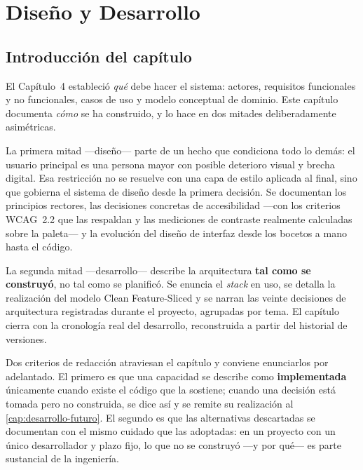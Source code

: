 \chapter{Diseño y Desarrollo}
\label{cap:diseno-desarrollo}

\newcommand{\partesep}[1]{%
  \bigskip
  \begin{center}\hrulefill\quad\textbf{\large #1}\quad\hrulefill\end{center}
  \addcontentsline{toc}{section}{#1}%
  \nopagebreak\medskip}

\section{Introducción del capítulo}

El Capítulo~4 estableció \emph{qué} debe hacer el sistema: actores, requisitos funcionales y no
funcionales, casos de uso y modelo conceptual de dominio. Este capítulo documenta \emph{cómo} se ha
construido, y lo hace en dos mitades deliberadamente asimétricas.

La primera mitad ---diseño--- parte de un hecho que condiciona todo lo demás: el usuario principal es una
persona mayor con posible deterioro visual y brecha digital. Esa restricción no se resuelve con una capa
de estilo aplicada al final, sino que gobierna el sistema de diseño desde la primera decisión. Se
documentan los principios rectores, las decisiones concretas de accesibilidad ---con los criterios WCAG~2.2
que las respaldan y las mediciones de contraste realmente calculadas sobre la paleta--- y la evolución del
diseño de interfaz desde los bocetos a mano hasta el código.

La segunda mitad ---desarrollo--- describe la arquitectura \textbf{tal como se construyó}, no tal como se
planificó. Se enuncia el \emph{stack} en uso, se detalla la realización del modelo Clean Feature-Sliced y
se narran las veinte decisiones de arquitectura registradas durante el proyecto, agrupadas por tema. El
capítulo cierra con la cronología real del desarrollo, reconstruida a partir del historial de versiones.

Dos criterios de redacción atraviesan el capítulo y conviene enunciarlos por adelantado. El primero es que
una capacidad se describe como \textbf{implementada} únicamente cuando existe el código que la sostiene;
cuando una decisión está tomada pero no construida, se dice así y se remite su realización al
\autoref{cap:desarrollo-futuro}. El segundo es que las alternativas descartadas se documentan con el mismo
cuidado que las adoptadas: en un proyecto con un único desarrollador y plazo fijo, lo que no se construyó
---y por qué--- es parte sustancial de la ingeniería.


